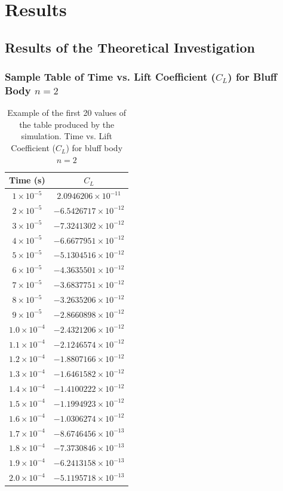 \section{Results}
\subsection{Results of the Theoretical Investigation}

\subsubsection{Sample Table of Time vs. Lift Coefficient ($C_L$) for Bluff Body $n=2$}

\begin{table}[H]
	\centering
	\begin{tabular}{|c|c|}
		\hline
		\textbf{Time (s)} & \textbf{$C_L$} \\
		\hline
		$1 \times 10^{-5}$ & $2.0946206 \times 10^{-11}$ \\
		\hline
		$2 \times 10^{-5}$ & $-6.5426717 \times 10^{-12}$ \\
		\hline
		$3 \times 10^{-5}$ & $-7.3241302 \times 10^{-12}$ \\
		\hline
		$4 \times 10^{-5}$ & $-6.6677951 \times 10^{-12}$ \\
		\hline
		$5 \times 10^{-5}$ & $-5.1304516 \times 10^{-12}$ \\
		\hline
		$6 \times 10^{-5}$ & $-4.3635501 \times 10^{-12}$ \\
		\hline
		$7 \times 10^{-5}$ & $-3.6837751 \times 10^{-12}$ \\
		\hline
		$8 \times 10^{-5}$ & $-3.2635206 \times 10^{-12}$ \\
		\hline
		$9 \times 10^{-5}$ & $-2.8660898 \times 10^{-12}$ \\
		\hline
		$1.0 \times 10^{-4}$ & $-2.4321206 \times 10^{-12}$ \\
		\hline
		$1.1 \times 10^{-4}$ & $-2.1246574 \times 10^{-12}$ \\
		\hline
		$1.2 \times 10^{-4}$ & $-1.8807166 \times 10^{-12}$ \\
		\hline
		$1.3 \times 10^{-4}$ & $-1.6461582 \times 10^{-12}$ \\
		\hline
		$1.4 \times 10^{-4}$ & $-1.4100222 \times 10^{-12}$ \\
		\hline
		$1.5 \times 10^{-4}$ & $-1.1994923 \times 10^{-12}$ \\
		\hline
		$1.6 \times 10^{-4}$ & $-1.0306274 \times 10^{-12}$ \\
		\hline
		$1.7 \times 10^{-4}$ & $-8.6746456 \times 10^{-13}$ \\
		\hline
		$1.8 \times 10^{-4}$ & $-7.3730846 \times 10^{-13}$ \\
		\hline
		$1.9 \times 10^{-4}$ & $-6.2413158 \times 10^{-13}$ \\
		\hline
		$2.0 \times 10^{-4}$ & $-5.1195718 \times 10^{-13}$ \\
		\hline
	\end{tabular}
	\label{tab:1FaceClTable}
	\caption{Example of the first 20 values of the table produced by the simulation. Time vs. Lift Coefficient ($C_L$) for bluff body $n=2$}
\end{table}

